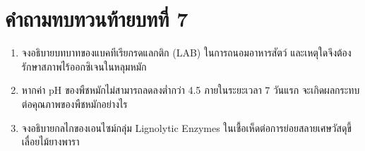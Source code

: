 \section*{คำถามทบทวนท้ายบทที่ 7}
\begin{enumerate}
    \item จงอธิบายบทบาทของแบคทีเรียกรดแลกติก (LAB) ในการถนอมอาหารสัตว์ และเหตุใดจึงต้องรักษาสภาพไร้ออกซิเจนในหลุมหมัก
    \item หากค่า pH ของพืชหมักไม่สามารถลดลงต่ำกว่า 4.5 ภายในระยะเวลา 7 วันแรก จะเกิดผลกระทบต่อคุณภาพของพืชหมักอย่างไร
    \item จงอธิบายกลไกของเอนไซม์กลุ่ม Lignolytic Enzymes ในเชื้อเห็ดต่อการย่อยสลายเศษวัสดุขี้เลื่อยไม้ยางพารา
\end{enumerate}

\clearpage